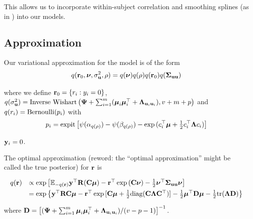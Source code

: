 \documentclass[times, doublespace]{anzsauth}
\newcommand{\joc}[1]{{\color{red}#1}}
\begin{document}
\noindent This allows us to incorporate within-subject correlation and smoothing splines (as in
\cite{Wand2008}) into our models.





\subsection{Approximation}

Our variational approximation for the model is of the form 
$$
q({\bf r}_0, {\boldsymbol \nu}, \sigma_{{\bf u}}^2, \rho) = q({\boldsymbol \nu})q(\rho) q({\bf r}_0)q({\boldsymbol \Sigma}_{{\bf u} {\bf u}})  \\
$$

\noindent 
where we define ${\bf r}_0 = \{ r_i : y_i = 0 \}$,
$q(\sigma_{{\bf u}}^2) = \mbox{Inverse Wishart}\left({\boldsymbol \Psi} + \sum_{i=1}^m ({\boldsymbol \mu}_i {\boldsymbol \mu}_i^\top + {\boldsymbol \Lambda}_{{\bf u}_i {\bf u}_i}), v + m + 
p\right)$ \mbox{and } $q(r_i) = \text{Bernoulli} (p_i)$ with
$$
p_i = \text{expit} \left[ \psi{(\alpha_{q(\rho)})} - \psi{(\beta_{q(\rho)})} - \exp{(c_i^\top{\boldsymbol\mu}+  \tfrac{1}{2} c_i^\top {\boldsymbol\Lambda}c_i)} \right]
$$

\noindent 
{} ${\bf y}_i = 0$.


\noindent The optimal approximation \joc{(reword: the ``optimal approximation'' might be called the true posterior)} for ${\bf r}$ is


$$
\begin{array}{rl}
	q({\bf r}) & \propto \exp \left [ {\mathbb E}_{-q({\bf r})}{\bf y}^\top{\bf R}({\bf C}{\boldsymbol \mu}) - {\bf r}^\top\exp{({\bf C}{\boldsymbol\nu})}-\tfrac{1}{2} {\boldsymbol \nu}^\top {\boldsymbol\Sigma}_{{\bf u} {\bf u}} {\boldsymbol \nu} \right ]                                                  \\ [1ex]
	       & = \exp{ \left\{ {\bf y}^\top{\bf R}{\bf C}{\boldsymbol\mu}- {\bf r}^\top \exp{[{\bf C}{\boldsymbol\mu}+  \tfrac{1}{2} \text{diag}({\bf C}{\boldsymbol\Lambda}{\bf C}^\top)]} -  \tfrac{1}{2} {\boldsymbol\mu}^\top {\bf D}{\boldsymbol\mu}-  \tfrac{1}{2} \text{tr}({\boldsymbol\Lambda}{\bf D}) \right\} } 
\end{array}
$$

\noindent where ${\bf D} = \left[ ({\boldsymbol \Psi} + \sum_{i=1}^m {\boldsymbol \mu}_i {\boldsymbol \mu}_i^\top + {\boldsymbol \Lambda}_{{\bf u}_i{\bf u}_i}) / (v - p - 1) \right]^{-1}$. 
\end{document}
